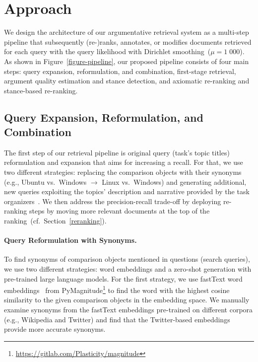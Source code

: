 \section{Approach}\label{approach}



We design the architecture of our argumentative retrieval system as a multi-step pipeline that subsequently (re-)ranks, annotates, or modifies documents retrieved for each query with the query likelihood with Dirichlet smoothing~(\(\mu = 1\;000\)). As shown in Figure~\ref{figure-pipeline}, our proposed pipeline consists of four main steps:
\Ni query expansion, reformulation, and combination,
\Nii first-stage retrieval,
\Niii argument quality estimation and stance detection,
and \Niv axiomatic re-ranking and stance-based re-ranking.

\subsection{Query Expansion, Reformulation, and Combination}
\label{reformulation}

The first step of our retrieval pipeline is original query (task's topic titles) reformulation and expansion that aims for increasing a recall.
For that, we use two different strategies: \Ni replacing the comparison objects with their synonyms (e.g., Ubuntu vs.\ Windows $\rightarrow$ Linux vs.\ Windows) and \Nii generating additional, new queries exploiting the topics' description and narrative provided by the task organizers~\cite{BondarenkoFKSGBPBSWPH2022}.
We then address the precision-recall trade-off by deploying re-ranking steps by moving more relevant documents at the top of the ranking~(cf.\ Section~\ref{reranking}).

\paragraph{Query Reformulation with Synonyms.}

To find synonyms of comparison objects mentioned in questions (search queries), we use two different strategies: \Ni word embeddings and \Nii a zero-shot generation with pre-trained large language models.
For the first strategy, we use fastText word embeddings~\cite{BojanowskiGJM2017} from PyMagnitude\footnote{\url{https://gitlab.com/Plasticity/magnitude}} to find the word with the highest cosine similarity to the given comparison objects in the embedding space.
We manually examine synonyms from the fastText embeddings pre-trained on different corpora (e.g., Wikipedia and Twitter) and find that the Twitter-based embeddings provide more accurate synonyms.

